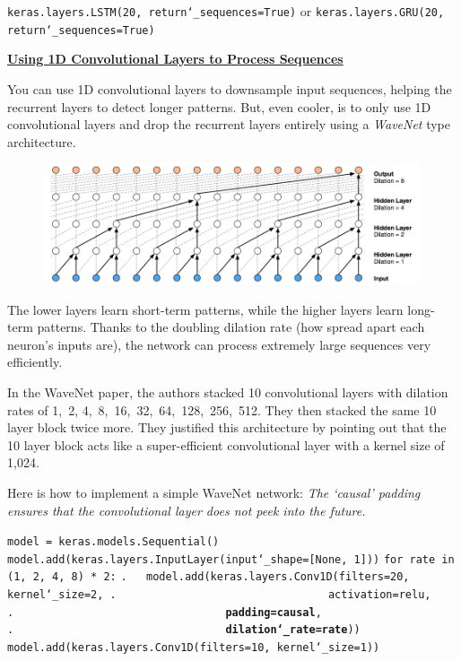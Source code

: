 \texttt{keras.layers.LSTM(20, return\char`_sequences=True)}\newline
or\newline
\texttt{keras.layers.GRU(20, return\char`_sequences=True)}\newline


\textbf{\underline{Using 1D Convolutional Layers to Process Sequences}}

You can use 1D convolutional layers to downsample input sequences, helping the recurrent layers to detect longer patterns.
But, even cooler, is to only use 1D convolutional layers and drop the recurrent layers entirely
using a \textit{WaveNet} type architecture.\newline

\begin{figure}[ht]
\centering
\includegraphics[width=0.99\textwidth]{./images/wavenet.png}
\end{figure}

\vspace{+2.0mm}
The lower layers learn short-term patterns, while the higher layers learn long-term patterns.
Thanks to the doubling dilation rate (how spread apart each neuron's inputs are),
the network can process extremely large sequences very efficiently.

In the WaveNet paper, the authors stacked 10 convolutional layers with dilation
rates of 1,~2, 4,~8,~16,~32,~64,~128,~256,~512.
They then stacked the same 10 layer block twice more.
They justified this architecture by pointing out that the 10 layer block
acts like a super-efficient convolutional layer with a kernel size of 1,024.

Here is how to implement a simple WaveNet network:\newline
\textit{The `causal' padding ensures that the convolutional layer does not peek into the future.}

\texttt{model = keras.models.Sequential()}\newline
\texttt{model.add(keras.layers.InputLayer(input\char`_shape=[None, 1]))}\newline
\texttt{for rate in (1, 2, 4, 8) * 2:}\newline
\texttt{.~~~model.add(keras.layers.Conv1D(filters=20, kernel\char`_size=2,\newline
.~~~~~~~~~~~~~~~~~~~~~~~~~~~~~~~~~activation=\textquotesingle relu\textquotesingle,\newline
.~~~~~~~~~~~~~~~~~~~~~~~~~~~~~~~~~\textbf{padding=\textquotesingle causal\textquotesingle},\newline
.~~~~~~~~~~~~~~~~~~~~~~~~~~~~~~~~~\textbf{dilation\char`_rate=rate}))}\newline
\texttt{model.add(keras.layers.Conv1D(filters=10, kernel\char`_size=1))}

